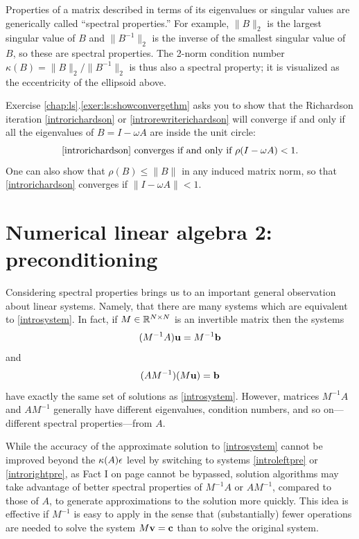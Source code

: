 Properties of a matrix described in terms of its eigenvalues or singular values are generically called ``spectral properties.''  For example, $\|B\|_2$ is the largest singular value of $B$ and $\|B^{-1}\|_2$ is the inverse of the smallest singular value of $B$, so these are spectral properties.  The 2-norm condition number $\kappa(B)=\|B\|_2/\|B^{-1}\|_2$ is thus also a spectral property; it is visualized as the eccentricity of the ellipsoid above.

Exercise \ref{chap:ls}.\ref{exer:ls:showconvergethm} asks you to show that the Richardson iteration \eqref{introrichardson} or \eqref{introrewriterichardson} will converge if and only if all the eigenvalues of $B=I-\omega A$ are inside the unit circle:
\begin{equation}
\text{\eqref{introrichardson} converges if and only if } \rho(I-\omega A) < 1. \label{introconvergethm}
\end{equation}
One can also show that $\rho(B) \le \|B\|$ in any induced matrix norm, so that \eqref{introrichardson} converges if $\|I-\omega A\| < 1$.


\section{Numerical linear algebra 2: preconditioning}

Considering spectral properties brings us to an important general observation about linear systems.  Namely, that there are many systems which are equivalent to \eqref{introsystem}.  In fact, if $M\in\mathbb{R}^{N\times N}$ is an invertible matrix then the systems
\begin{equation}
(M^{-1} A) \mathbf{u} = M^{-1} \mathbf{b} \label{introleftpre}
\end{equation}
and
\begin{equation}
(A M^{-1}) (M\mathbf{u}) = \mathbf{b} \label{introrightpre}
\end{equation}
have exactly the same set of solutions as \eqref{introsystem}.  However, matrices $M^{-1} A$ and $A M^{-1}$ generally have different eigenvalues, condition numbers, and so on---different spectral properties---from $A$.

While the accuracy of the approximate solution to \eqref{introsystem} cannot be improved beyond the $\kappa(A) \epsilon$ level by switching to systems \eqref{introleftpre} or \eqref{introrightpre}, as Fact I on page \pageref{page:ls:limittoaccuracy} cannot be bypassed, solution algorithms may take advantage of better spectral properties of $M^{-1} A$ or $A M^{-1}$, compared to those of $A$, to generate approximations to the solution more quickly.  This idea is effective if $M^{-1}$ is easy to apply in the sense that (substantially) fewer operations are needed to solve the system $M\mathbf{v}=\mathbf{c}$ than to solve the original system.

